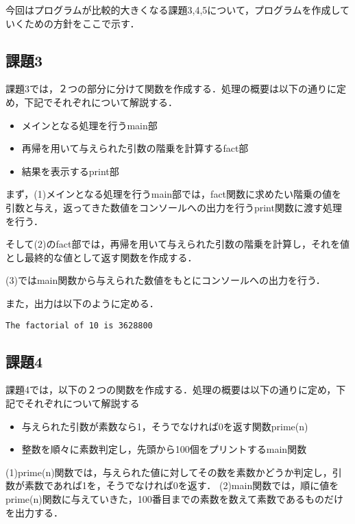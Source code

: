 \documentclass[a4j]{jarticle}
\begin{document}
今回はプログラムが比較的大きくなる課題3,4,5について，プログラムを作成していくための方針をここで示す．

\subsection{課題3}

課題3では，２つの部分に分けて関数を作成する．処理の概要は以下の通りに定め，下記でそれぞれについて解説する．

\begin{itemize}
\item[(1)]メインとなる処理を行うmain部
\item[(2)]再帰を用いて与えられた引数の階乗を計算するfact部
\item[(3)]結果を表示するprint部
\end{itemize}

まず，(1)メインとなる処理を行うmain部では，fact関数に求めたい階乗の値を引数と与え，返ってきた数値をコンソールへの出力を行うprint関数に渡す処理を行う．

そして(2)のfact部では，再帰を用いて与えられた引数の階乗を計算し，それを値とし最終的な値として返す関数を作成する．

(3)ではmain関数から与えられた数値をもとにコンソールへの出力を行う． 

また，出力は以下のように定める．

{\baselineskip 3mm
\begin{verbatim}
The factorial of 10 is 3628800
\end{verbatim}
}


\subsection{課題4}

課題4では，以下の２つの関数を作成する．処理の概要は以下の通りに定め，下記でそれぞれについて解説する

\begin{itemize}
\item[(1)]与えられた引数が素数なら1，そうでなければ0を返す関数prime(n)
\item[(2)]整数を順々に素数判定し，先頭から100個をプリントするmain関数
\end{itemize}


(1)prime(n)関数では，与えられた値に対してその数を素数かどうか判定し，引数が素数であれば1を，そうでなければ0を返す．
(2)main関数では，順に値をprime(n)関数に与えていきた，100番目までの素数を数えて素数であるものだけを出力する．
\end{document}
